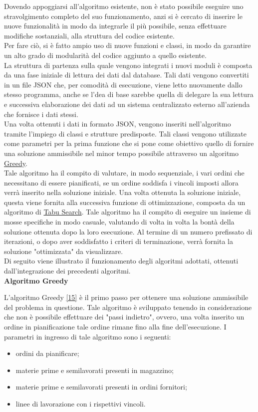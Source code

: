 Dovendo appoggiarsi all'algoritmo esistente, non è stato possibile eseguire uno stravolgimento completo del suo funzionamento, anzi si è cercato di inserire le nuove funzionalità
in modo da integrarle il più possibile, senza effettuare modifiche sostanziali, alla struttura del codice esistente.\\ Per fare ciò, si è fatto ampio uso di nuove funzioni e
classi, in modo da garantire un alto grado di modularità del codice aggiunto a quello esistente.
\\ La struttura di partenza sulla quale vengono integrati i nuovi moduli è composta da una fase iniziale
di lettura dei dati dal database. Tali dati vengono convertiti in un file JSON che, per comodità di esecuzione, viene letto nuovamente dallo stesso programma, anche se
l'dea di base sarebbe quella di delegare la sua lettura e successiva elaborazione dei dati ad un sistema centralizzato esterno all'azienda che fornisce i dati stessi.\\
Una volta ottenuti i dati in formato JSON, vengono inseriti nell'algoritmo tramite l'impiego di classi e strutture predisposte. Tali classi vengono utilizzate come parametri
per la prima funzione che si pone come obiettivo quello di fornire una soluzione ammissibile nel minor tempo possibile attraverso un algoritmo \hyperref[Greedy]{Greedy\glo}.\\
Tale algoritmo ha il compito di valutare, in modo sequenziale, i vari ordini che necessitano di essere pianificati, se un ordine soddisfa i vincoli imposti allora verrà inserito nella soluzione iniziale.
Una volta ottenuta la soluzione iniziale, questa viene fornita alla successiva funzione di ottimizzazione, composta da un algoritmo di \hyperref[Tabu Search]{Tabu Search\glo}. Tale algoritmo ha il compito
di eseguire un insieme di mosse specifiche in modo casuale, valutando di volta in volta la bontà della soluzione ottenuta dopo la loro esecuzione. Al termine di un numero prefissato
di iterazioni, o dopo aver soddisfatto i criteri di terminazione, verrà fornita la soluzione "ottimizzata" da visualizzare.\\
Di seguito viene illustrato il funzionamento degli algoritmi adottati, ottenuti dall'integrazione dei precedenti algoritmi.\\

\textbf{Algoritmo Greedy}

L'algoritmo Greedy \hyperref[slide]{[15]} è il primo passo per ottenere una soluzione ammissibile del problema in questione. Tale algoritmo è sviluppato tenendo in considerazione che non è possibile effettuare dei "passi indietro",
ovvero, una volta inserito un ordine in pianificazione tale ordine rimane fino alla fine dell'esecuzione. I parametri in ingresso di tale algoritmo sono i seguenti:
\begin{itemize}
    \item ordini da pianificare;
    \item materie prime e semilavorati presenti in magazzino;
    \item materie prime e semilavorati presenti in ordini fornitori;
    \item linee di lavorazione con i rispettivi vincoli.
\end{itemize}

